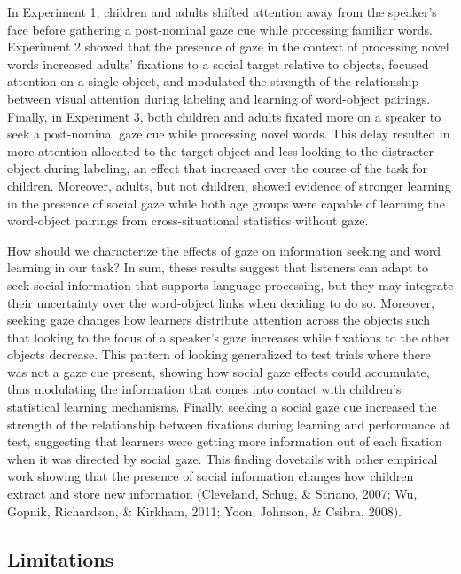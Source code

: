 \documentclass[man,floatsintext]{apa6}
\begin{document}
In Experiment 1, children and adults shifted attention away from the
speaker's face before gathering a post-nominal gaze cue while processing
familiar words. Experiment 2 showed that the presence of gaze in the
context of processing novel words increased adults' fixations to a
social target relative to objects, focused attention on a single object,
and modulated the strength of the relationship between visual attention
during labeling and learning of word-object pairings. Finally, in
Experiment 3, both children and adults fixated more on a speaker to seek
a post-nominal gaze cue while processing novel words. This delay
resulted in more attention allocated to the target object and less
looking to the distracter object during labeling, an effect that
increased over the course of the task for children. Moreover, adults,
but not children, showed evidence of stronger learning in the presence
of social gaze while both age groups were capable of learning the
word-object pairings from cross-situational statistics without gaze.

How should we characterize the effects of gaze on information seeking
and word learning in our task? In sum, these results suggest that
listeners can adapt to seek social information that supports language
processing, but they may integrate their uncertainty over the
word-object links when deciding to do so. Moreover, seeking gaze changes
how learners distribute attention across the objects such that looking
to the focus of a speaker's gaze increases while fixations to the other
objects decrease. This pattern of looking generalized to test trials
where there was not a gaze cue present, showing how social gaze effects
could accumulate, thus modulating the information that comes into
contact with children's statistical learning mechanisms. Finally,
seeking a social gaze cue increased the strength of the relationship
between fixations during learning and performance at test, suggesting
that learners were getting more information out of each fixation when it
was directed by social gaze. This finding dovetails with other empirical
work showing that the presence of social information changes how
children extract and store new information (Cleveland, Schug, \&
Striano, 2007; Wu, Gopnik, Richardson, \& Kirkham, 2011; Yoon, Johnson,
\& Csibra, 2008).

\subsection{Limitations}\label{limitations-1}
\end{document}
